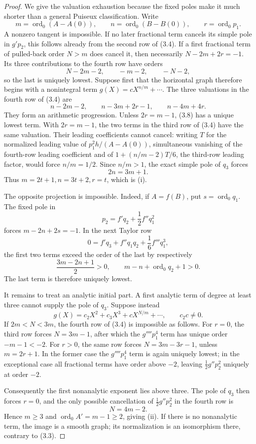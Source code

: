 \documentclass[11pt]{article}
\theoremstyle{definition}
\theoremstyle{remark}
\newcommand{\ord}{\operatorname{ord}}
\begin{document}
\begin{proof}
We give the valuation exhaustion because the fixed poles make it much
shorter than a general Puiseux classification.  Write
\[
 m=\ord_0(A-A(0)),\qquad n=\ord_0(B-B(0)),\qquad
 r=\ord_0p_1.
\]
A nonzero tangent is impossible.  If no later fractional term cancels
its simple pole in \(g'p_2\), this follows already from the second row
of (3.4).  If a first fractional term of pulled-back order \(N>m\)
does cancel it, then necessarily
\(N-2m+2r=-1\).  Its three contributions to the fourth row have orders
\[
N-2m-2,\qquad -m-2,\qquad -N-2,
\]
so the last is uniquely lowest.  Suppose first that the horizontal graph
therefore begins with a nonintegral term
\(g(X)=cX^{n/m}+\cdots\).
The three valuations in the fourth row of (3.4) are
\[
 n-2m-2,\qquad n-3m+2r-1,\qquad n-4m+4r.               \tag{3.8}
\]
They form an arithmetic progression.  Unless
\(2r=m-1\), (3.8) has a unique lowest term.  With
\(2r=m-1\), the two terms in the third row of (3.4) have the same
valuation.  Their leading coefficients cannot cancel: writing \(T\) for
the normalized leading value of \(p_1^2h/(A-A(0))\), simultaneous
vanishing of the fourth-row leading coefficient and of
\(1+(n/m-2)T/6\), the third-row leading factor, would force
\(n/m=1/2\).  Since \(n/m>1\), the exact simple pole of \(q_3\) forces
\[
 2n=3m+1.
\]
Thus \(m=2t+1,n=3t+2,r=t\), which is (i).

The opposite projection is impossible.  Indeed, if
\(A=f(B)\), put \(s=\ord_0q_1\).  The fixed pole in
\[
 p_2=f'q_2+\frac12f''q_1^2
\]
forces \(m-2n+2s=-1\).  In the next Taylor row
\[
 0=f'q_3+f''q_1q_2+\frac16f'''q_1^3,
\]
the first two terms exceed the order of the last by respectively
\[
 \frac{3m-2n+1}{2}>0,\qquad m-n+\ord_0q_2+1>0.
\]
The last term is therefore uniquely lowest.

It remains to treat an analytic initial part.  A first analytic term of
degree at least three cannot supply the pole of \(q_3\).  Suppose instead
\[
 g(X)=c_2X^2+c_3X^3+cX^{N/m}+\cdots,\qquad c_2c\ne0.
\]
If \(2m<N<3m\), the fourth row of (3.4) is impossible as follows.
For \(r=0\), the third row forces \(N=3m-1\), after which the
\(g''''p_1^4\) term has unique order \(-m-1<-2\).  For \(r>0\), the
same row forces \(N=3m-3r-1\), unless \(m=2r+1\).  In the former case
the \(g''''p_1^4\) term is again uniquely lowest; in the exceptional
case all fractional terms have order above \(-2\), leaving
\(\frac12g''p_2^2\) uniquely at order \(-2\).

Consequently the first nonanalytic exponent lies above three.  The pole
of \(q_3\) then forces \(r=0\), and the only possible cancellation of
\(\frac12g''p_2^2\) in the fourth row is
\[
 N=4m-2.
\]
Hence \(m\ge3\) and \(\ord_0A'=m-1\ge2\), giving (ii).  If there is no
nonanalytic term, the image is a smooth graph; its normalization is an
isomorphism there, contrary to (3.3).


\end{proof}
\end{document}
